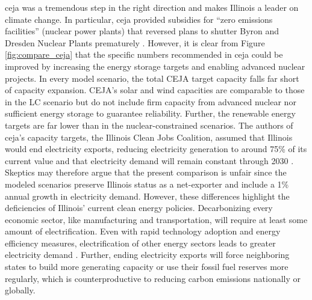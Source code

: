 \gls{ceja} was a tremendous step in the right direction and makes Illinois a leader
on climate change. In particular, \gls{ceja} provided subsidies for ``zero
emissions facilities'' (nuclear power plants) that reversed plans to shutter Byron
and Dresden Nuclear Plants prematurely \cite{harmon_climate_2021,brown_two_2021}.
However, it is clear from Figure \ref{fig:compare_ceja} that the specific numbers
recommended in \gls{ceja} could be improved by increasing the energy storage
targets and enabling advanced nuclear projects.
In every model scenario, the total CEJA target capacity falls far short of capacity
expansion. CEJA's solar and wind capacities are comparable to those in the \gls{LC}
scenario but do not include firm capacity from advanced nuclear nor sufficient
energy storage to guarantee reliability. Further, the
renewable energy targets are far lower than in the nuclear-constrained scenarios.
The authors of \gls{ceja}'s capacity targets, the Illinois Clean Jobs Coalition,
assumed that Illinois would end electricity exports, reducing electricity generation
to around 75\% of its current value and that electricity demand will remain constant
through 2030 \cite{the_accelerate_group_clean_2019}. Skeptics may therefore argue
that the present comparison is unfair since the modeled scenarios preserve Illinois
status as a net-exporter and include a 1\% annual growth in electricity demand.
However, these differences highlight the deficiencies of Illinois' current
clean energy policies. Decarbonizing every economic sector, like manufacturing and
transportation, will require
at least some amount of electrification. Even with rapid technology adoption and
energy efficiency measures, electrification of other energy sectors leads to greater
electricity demand \cite{mai_electrification_2018}. Further, ending electricity
exports will force neighboring states to build more generating capacity or use
their fossil fuel reserves more regularly, which is counterproductive to reducing
carbon emissions nationally or globally.

